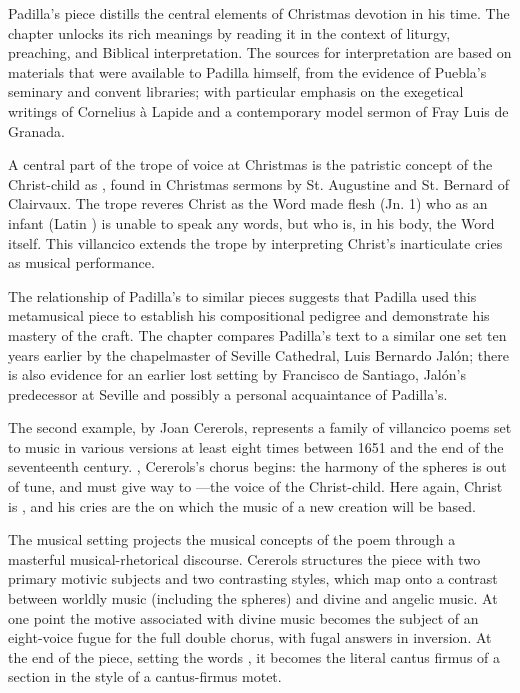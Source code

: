 \documentclass{vcbook-proposal}
\begin{document}
Padilla's piece distills the central elements of Christmas devotion in his time.
The chapter unlocks its rich meanings by reading it in the context of liturgy, 
preaching, and Biblical interpretation.
The sources for interpretation are based on materials that were available to
Padilla himself, from the evidence of Puebla's seminary and convent libraries;
with particular emphasis on the exegetical writings of Cornelius à Lapide and a
contemporary model sermon of Fray Luis de Granada.

A central part of the trope of voice at Christmas is the patristic concept of 
the Christ-child as , found in Christmas sermons by St.
Augustine and St. Bernard of Clairvaux.
The trope reveres Christ as the Word made flesh (Jn. 1) who as an infant (Latin 
) is unable to speak any words, but who is, in his body, the 
Word itself.
This villancico extends the trope by interpreting Christ's inarticulate cries 
as musical performance.

The relationship of Padilla's  to similar 
pieces suggests that Padilla used this metamusical piece to establish his 
compositional pedigree and demonstrate his mastery of the craft.
The chapter compares Padilla's text to a similar one set ten years earlier by
the chapelmaster of Seville Cathedral, Luis Bernardo Jalón; there is also
evidence for an earlier lost setting by Francisco de Santiago, Jalón's
predecessor at Seville and possibly a personal acquaintance of Padilla's.



The second example,  by Joan Cererols, represents a
family of villancico poems set to music in various versions at least eight times
between 1651 and the end of the seventeenth century.
, Cererols's chorus begins:
the harmony of the spheres is out of tune, and must give 
way to ---the voice of the Christ-child.
Here again, Christ is , and his cries are the
 on which the music of a new creation will be based.

The musical setting projects the musical concepts of the poem through a 
masterful musical-rhetorical discourse.
Cererols structures the piece with two primary motivic subjects and two 
contrasting styles, which map onto a contrast between worldly music (including 
the spheres) and divine and angelic music. 
At one point the motive associated with divine music becomes the subject of an 
eight-voice fugue for the full double chorus, with fugal answers in inversion.
At the end of the piece, setting the words , it becomes the literal cantus firmus of a section in the style of a 
cantus-firmus motet.
\end{document}
